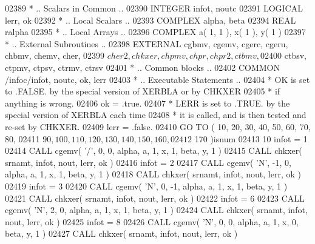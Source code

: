 \begin{DoxyCode}
02389 \textcolor{comment}{*     .. Scalars in Common ..}
02390       \textcolor{keywordtype}{INTEGER}            infot, noutc
02391       \textcolor{keywordtype}{LOGICAL}            lerr, ok
02392 \textcolor{comment}{*     .. Local Scalars ..}
02393       \textcolor{keywordtype}{COMPLEX}            alpha, beta
02394       \textcolor{keywordtype}{REAL}               ralpha
02395 \textcolor{comment}{*     .. Local Arrays ..}
02396       \textcolor{keywordtype}{COMPLEX}            a( 1, 1 ), x( 1 ), y( 1 )
02397 \textcolor{comment}{*     .. External Subroutines ..}
02398       \textcolor{keywordtype}{EXTERNAL}           cgbmv, cgemv, cgerc, cgeru, chbmv, chemv, cher,
02399      $                   cher2, chkxer, chpmv, chpr, chpr2, ctbmv,
02400      $                   ctbsv, ctpmv, ctpsv, ctrmv, ctrsv
02401 \textcolor{comment}{*     .. Common blocks ..}
02402       \textcolor{keyword}{COMMON}             /infoc/infot, noutc, ok, lerr
02403 \textcolor{comment}{*     .. Executable Statements ..}
02404 \textcolor{comment}{*     OK is set to .FALSE. by the special version of XERBLA or by CHKXER}
02405 \textcolor{comment}{*     if anything is wrong.}
02406       ok = .true.
02407 \textcolor{comment}{*     LERR is set to .TRUE. by the special version of XERBLA each time}
02408 \textcolor{comment}{*     it is called, and is then tested and re-set by CHKXER.}
02409       lerr = .false.
02410       \textcolor{keywordflow}{GO TO} ( 10, 20, 30, 40, 50, 60, 70, 80,
02411      $        90, 100, 110, 120, 130, 140, 150, 160,
02412      $        170 )isnum
02413    10 infot = 1
02414       \textcolor{keyword}{CALL }cgemv( \textcolor{stringliteral}{'/'}, 0, 0, alpha, a, 1, x, 1, beta, y, 1 )
02415       \textcolor{keyword}{CALL }chkxer( srnamt, infot, nout, lerr, ok )
02416       infot = 2
02417       \textcolor{keyword}{CALL }cgemv( \textcolor{stringliteral}{'N'}, -1, 0, alpha, a, 1, x, 1, beta, y, 1 )
02418       \textcolor{keyword}{CALL }chkxer( srnamt, infot, nout, lerr, ok )
02419       infot = 3
02420       \textcolor{keyword}{CALL }cgemv( \textcolor{stringliteral}{'N'}, 0, -1, alpha, a, 1, x, 1, beta, y, 1 )
02421       \textcolor{keyword}{CALL }chkxer( srnamt, infot, nout, lerr, ok )
02422       infot = 6
02423       \textcolor{keyword}{CALL }cgemv( \textcolor{stringliteral}{'N'}, 2, 0, alpha, a, 1, x, 1, beta, y, 1 )
02424       \textcolor{keyword}{CALL }chkxer( srnamt, infot, nout, lerr, ok )
02425       infot = 8
02426       \textcolor{keyword}{CALL }cgemv( \textcolor{stringliteral}{'N'}, 0, 0, alpha, a, 1, x, 0, beta, y, 1 )
02427       \textcolor{keyword}{CALL }chkxer( srnamt, infot, nout, lerr, ok )

\end{DoxyCode}
